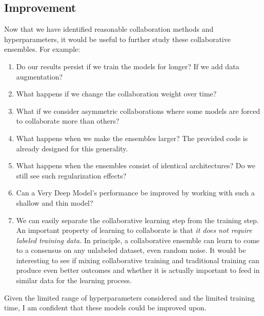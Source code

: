 \documentclass[english,a4paper,oneside]{amsart}
\theoremstyle{definition}
\begin{document}
\subsection{Improvement}
Now that we have identified reasonable collaboration methods and hyperparameters, it would be useful to further study these collaborative ensembles. For example:
\begin{enumerate}
	\item Do our results persist if we train the models for longer? If we add data augmentation?
	\item What happens if we change the collaboration weight over time? 
	\item What if we consider asymmetric collaborations where some models are forced to collaborate more than others?
	\item What happens when we make the ensembles larger? The provided code is already designed for this generality.
	\item What happens when the ensembles consist of identical architectures? Do we still see such regularization effects?
	\item Can a Very Deep Model's performance be improved by working with such a shallow and thin model?
	\item We can easily separate the collaborative learning step from the training step. An important property of learning to collaborate is that \emph{it does not require labeled training data.} In principle, a collaborative ensemble can learn to come to a consensus on any unlabeled dataset, even random noise. It would be interesting to see if mixing collaborative training and traditional training can produce even better outcomes and whether it is actually important to feed in similar data for the learning process. 
\end{enumerate}

Given the limited range of hyperparameters considered and the limited training time, I am confident that these models could be improved upon. 

\end{document}
